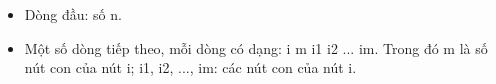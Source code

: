 \begin{itemize}
	\item Dòng đầu: số n.
	\item Một số dòng tiếp theo, mỗi dòng có dạng: i m i1 i2 ... im. Trong đó m là số nút con của nút i; i1, i2, ..., im: các nút con của nút i.
\end{itemize}